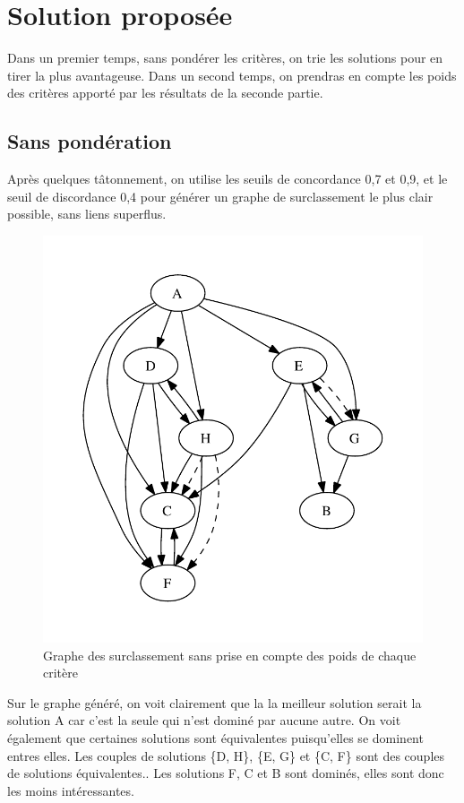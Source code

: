 \section{Solution proposée}

Dans un premier temps, sans pondérer les critères, on trie les solutions pour en tirer la plus avantageuse. Dans un second temps, on prendras en compte les poids des critères apporté par les résultats de la seconde partie.

\subsection{Sans pondération}

Après quelques tâtonnement, on utilise les seuils de concordance 0,7 et 0,9, et le seuil de discordance 0,4 pour générer un graphe de surclassement le plus clair possible, sans liens superflus.

\begin{figure}[!ht]
\includegraphics{../SourcesMatlab/electre3-1.pdf}
\caption{Graphe des surclassement sans prise en compte des poids de chaque critère}
\end{figure}

Sur le graphe généré, on voit clairement que la la meilleur solution serait la
solution A car c'est la seule qui n'est dominé par aucune autre.
On voit également que certaines solutions sont équivalentes puisqu'elles se
dominent entres elles. Les couples de solutions \{D, H\}, \{E, G\} et \{C, F\}
sont des couples de solutions équivalentes..
Les solutions F, C et B sont dominés, elles sont donc les moins intéressantes.


